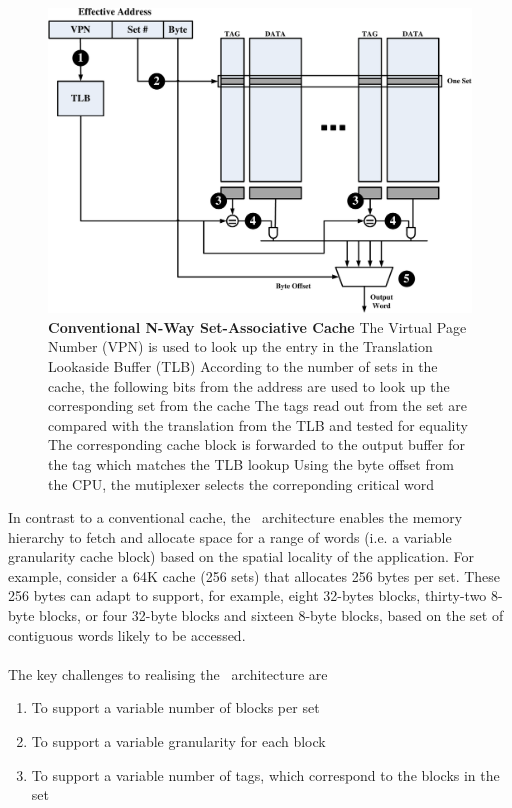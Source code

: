 \begin{figure}[b]
  \begin{center}
    \includegraphics[width=\textwidth]{files/Figures/06-NWaySetAssocCache.pdf}
    \caption[Conventional N-Way Set-Associative Cache]{\textbf{Conventional N-Way Set-Associative Cache}  The Virtual Page Number (VPN) is used to look up the entry in the Translation Lookaside Buffer (TLB)  According to the number of sets in the cache, the following bits from the address are used to look up the corresponding set from the cache  The tags read out from the set are compared with the translation from the TLB and tested for equality  The corresponding cache block is forwarded to the output buffer for the tag which matches the TLB lookup  Using the byte offset from the CPU, the mutiplexer selects the correponding critical word }
    \label{fig:set_assoc_arch}
  \end{center}
\end{figure}

\clearpage

In contrast to a conventional cache, the \AC\ architecture enables the memory hierarchy to fetch and allocate space for a range of words (i.e. a variable granularity cache block) based on the spatial locality of the application. For example, consider a 64K cache (256 sets) that allocates 256 bytes per set. These 256 bytes can adapt to support, for example, eight 32-bytes blocks, thirty-two 8-byte blocks, or four 32-byte blocks and sixteen 8-byte blocks, based on the set of contiguous words likely to be accessed. 
\\ \\
The key challenges to realising the \AC\ architecture are
\begin{enumerate}[noitemsep]
	\item To support a variable number of blocks per set
	\item To support a variable granularity for each block
	\item To support a variable number of tags, which correspond to the blocks in the set
\end{enumerate}

